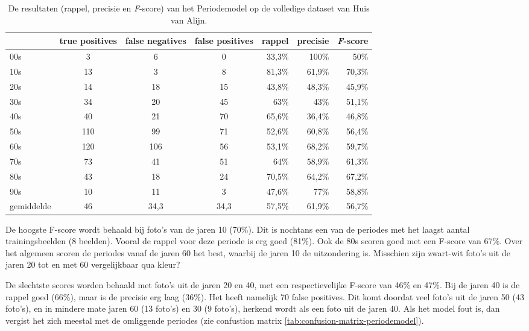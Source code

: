 \begin{table}
    \renewcommand\arraystretch{1.2}
    \begin{tabular}{l|ccc|rrr}
        \toprule
        & true positives  & false negatives & false positives & rappel & precisie & \textit{F}-score \\ 
        \midrule
        00s & 3 & 6 & 0 & 33,3\% & 100\% & 50\% \\ 
        10s & 13 & 3 & 8 &  81,3\% & 61,9\% & 70,3\% \\ 
        20s & 14 & 18 & 15 & 43,8\% & 48,3\% & 45,9\% \\ 
        30s & 34 & 20 & 45  & 63\% & 43\% & 51,1\% \\ 
        40s & 40 & 21 & 70  & 65,6\% & 36,4\% & 46,8\% \\ 
        50s & 110 & 99 & 71  & 52,6\% & 60,8\% & 56,4\% \\ 
        60s & 120 & 106 & 56  & 53,1\% & 68,2\% & 59,7\% \\ 
        70s & 73 & 41 & 51  & 64\% & 58,9\% & 61,3\% \\ 
        80s & 43 & 18 & 24  & 70,5\% & 64,2\% & 67,2\% \\ 
        90s & 10 & 11 & 3  & 47,6\% & 77\% & 58,8\% \\ 
        \midrule
        gemiddelde & 46 & 34,3 & 34,3  & 57,5\% & 61,9\% & 56,7\% \\ 
        \bottomrule
    \end{tabular} 
    \caption{De resultaten (rappel, precisie en \textit{F}-score) van het Periodemodel op de volledige dataset van Huis van Alijn.}
    \label{tab:resultaten-periodemodel}
\end{table}

De hoogste F-score wordt behaald bij foto’s van de jaren 10 (70\%). Dit is nochtans een van de periodes met het laagst aantal trainingsbeelden (8 beelden). Vooral de rappel voor deze periode is erg goed (81\%). Ook de 80s scoren goed met een F-score van 67\%. Over het algemeen scoren de periodes vanaf de jaren 60 het best, waarbij de jaren 10 de uitzondering is. Misschien zijn zwart-wit foto’s uit de jaren 20 tot en met 60 vergelijkbaar qua kleur?

De slechtste scores worden behaald met foto’s uit de jaren 20 en 40, met een respectievelijke F-score van 46\% en 47\%. Bij de jaren 40 is de rappel goed (66\%), maar is de precisie erg laag (36\%). Het heeft namelijk 70 false positives. Dit komt doordat veel foto’s uit de jaren 50 (43 foto’s), en in mindere mate jaren 60 (13 foto’s) en 30 (9 foto’s), herkend wordt als een foto uit de jaren 40. Als het model fout is, dan vergist het zich meestal met de omliggende periodes (zie confustion matrix \ref{tab:confusion-matrix-periodemodel}).

